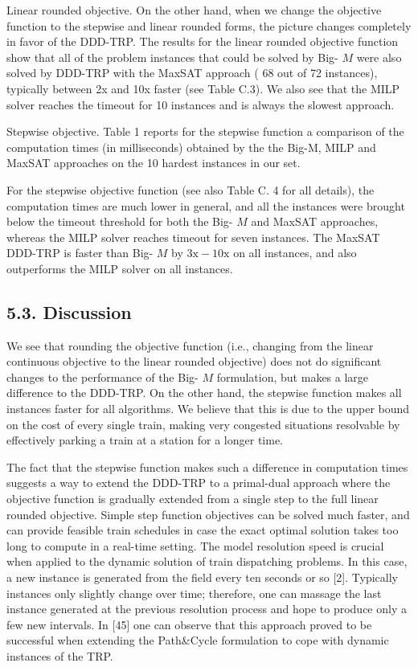 \documentclass[10pt]{article}
\begin{document}
Linear rounded objective. On the other hand, when we change the objective function to the stepwise and linear rounded forms, the picture changes completely in favor of the DDD-TRP. The results for the linear rounded objective function show that all of the problem instances that could be solved by Big- $M$ were also solved by DDD-TRP with the MaxSAT approach ( 68 out of 72 instances), typically between 2x and 10x faster (see Table C.3). We also see that the MILP solver reaches the timeout for 10 instances and is always the slowest approach.

Stepwise objective. Table 1 reports for the stepwise function a comparison of the computation times (in milliseconds) obtained by the the Big-M, MILP and MaxSAT approaches on the 10 hardest instances in our set.

For the stepwise objective function (see also Table C. 4 for all details), the computation times are much lower in general, and all the instances were brought below the timeout threshold for both the Big- $M$ and MaxSAT approaches, whereas the MILP solver reaches timeout for seven instances. The MaxSAT DDD-TRP is faster than Big- $M$ by $3 \mathrm{x}-10 \mathrm{x}$ on all instances, and also outperforms the MILP solver on all instances.

\subsection*{5.3. Discussion}
We see that rounding the objective function (i.e., changing from the linear continuous objective to the linear rounded objective) does not do significant changes to the performance of the Big- $M$ formulation, but makes a large difference to the DDD-TRP. On the other hand, the stepwise function makes all instances faster for all algorithms. We believe that this is due to the upper bound on the cost of every single train, making very congested situations resolvable by effectively parking a train at a station for a longer time.

The fact that the stepwise function makes such a difference in computation times suggests a way to extend the DDD-TRP to a primal-dual approach where the objective function is gradually extended from a single step to the full linear rounded objective. Simple step function objectives can be solved much faster, and can provide feasible train schedules in case the exact optimal solution takes too long to compute in a real-time setting. The model resolution speed is crucial when applied to the dynamic solution of train dispatching problems. In this case, a new instance is generated from the field every ten seconds or so [2]. Typically instances only slightly change over time; therefore, one can massage the last instance generated at the previous resolution process and hope to produce only a few new intervals. In [45] one can observe that this approach proved to be successful when extending the Path\&Cycle formulation to cope with dynamic instances of the TRP.
\end{document}
